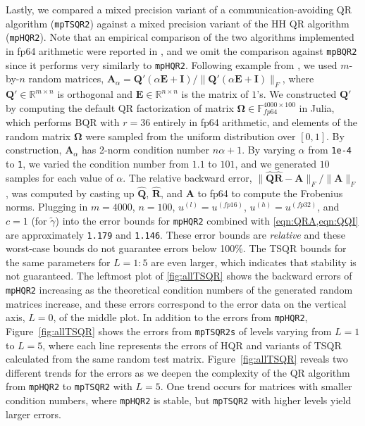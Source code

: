 \documentclass[review,onefignum,onetabnum]{siamart190516}
\newcommand{\R}{\mathbb{R}}
\newcommand{\F}{\mathbb{F}}
\newcommand{\bb}[1]{\mathbf{#1}}
\begin{document}
Lastly, we compared a mixed precision variant of a communication-avoiding QR algorithm ({\tt mpTSQR2}) against a mixed precision variant of the HH QR algorithm ({\tt mpHQR2}).
Note that an empirical comparison of the two algorithms implemented in fp64 arithmetic were reported in \cite{Mori2012}, and we omit the comparison against {\tt mpBQR2} since it performs very similarly to {\tt mpHQR2}.
Following example from \cite{Mori2012}, we used $m$-by-$n$ random matrices, $\bb{A}_{\alpha} = \bb{Q'}(\alpha \bb{E} + \bb{I})/\|\bb{Q'}(\alpha \bb{E} + \bb{I})\|_F$, where $\bb{Q'}\in\mathbb{R}^{m\times n}$ is orthogonal and $\bb{E}\in\R^{n\times n}$ is the matrix of $1$'s. 
We constructed $\bb{Q'}$ by computing the default QR factorization of matrix $\bb{\Omega}\in\F_{fp64}^{4000\times100}$ in Julia, which performs BQR with $r=36$ entirely in fp64 arithmetic, and elements of the random matrix $\bb{\Omega}$ were sampled from the uniform distribution over $[0,1]$.
By construction, $\bb{A}_{\alpha}$ has 2-norm condition number $n\alpha+1$. 
By varying $\alpha$ from {\tt 1e-4} to {\tt 1}, we varied the condition number from $1.1$ to $101$, and we generated $10$ samples for each value of $\alpha$.
The relative backward error, $\|\hat{\bb{Q}}\hat{\bb{R}}-\bb{A}\|_F/\|\bb{A}\|_F$, was computed by casting up $\hat{\bb{Q}}$, $\hat{\bb{R}}$, and $\bb{A}$ to fp64 to compute the Frobenius norms.
Plugging in $m=4000$, $n=100$, $u^{(l)}=u^{(fp16)}$, $u^{(h)}=u^{(fp32)}$, and $c=1$ (for $\tilde{\gamma}$) into the error bounds for {\tt mpHQR2} combined with \cref{eqn:QRA,eqn:QQI} are approximately {\tt 1.179} and {\tt 1.146}.
These error bounds are \emph{relative} and these worst-case bounds do not guarantee errors below 100\%.
The TSQR bounds for the same parameters for $L=1:5$ are even larger, which indicates that stability is not guaranteed. 
The leftmost plot of \cref{fig:allTSQR} shows the backward errors of {\tt mpHQR2} increasing as the theoretical condition numbers of the generated random matrices increase, and these errors correspond to the error data on the vertical axis, $L=0$, of the middle plot.
In addition to the errors from {\tt mpHQR2}, Figure~\ref{fig:allTSQR} shows the errors from {\tt mpTSQR2s} of levels varying from $L=1$ to $L=5$, where each line represents the errors of HQR and variants of TSQR calculated from the same random test matrix.
Figure~\ref{fig:allTSQR} reveals two different trends for the errors as we deepen the complexity of the QR algorithm from {\tt mpHQR2} to {\tt mpTSQR2} with $L=5$. 
One trend occurs for matrices with smaller condition numbers, where {\tt mpHQR2} is stable, but {\tt mpTSQR2} with higher levels yield larger errors. 
\end{document}
